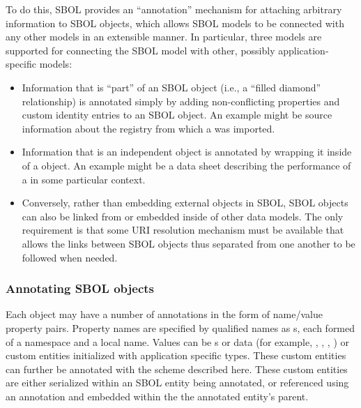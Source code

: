 To do this, SBOL provides an ``annotation'' mechanism for attaching arbitrary information to SBOL objects, which allows SBOL models to be connected with any other models in an extensible manner.
In particular, three models are supported for connecting the SBOL model with other, possibly application-specific models:
\begin{itemize}
\item Information that is ``part'' of an SBOL object (i.e., a ``filled diamond'' relationship) is annotated simply by adding non-conflicting properties and custom identity entries to an SBOL object.  An example might be source information about the registry from which a  was imported.
\item Information that is an independent object is annotated by wrapping it inside of a  object.  An example might be a data sheet describing the performance of a  in some particular context.
\item Conversely, rather than embedding external objects in SBOL, SBOL objects can also be linked from or embedded inside of other data models.  The only requirement is that some URI resolution mechanism must be available that allows the links between SBOL objects thus separated from one another to be followed when needed.
\end{itemize}


\subsubsection{Annotating SBOL objects}


Each  object may have a number of annotations in the form of name/value property pairs. 
Property names are specified by qualified names as s, each formed of a namespace and a local name. 
Values can be s or  data (for example, , , , ) or custom  entities initialized with application specific types. 
These custom  entities can further be annotated with the scheme described here. These custom entities are either serialized within an SBOL entity being annotated, or referenced using an  annotation and embedded within the the annotated entity's parent.

